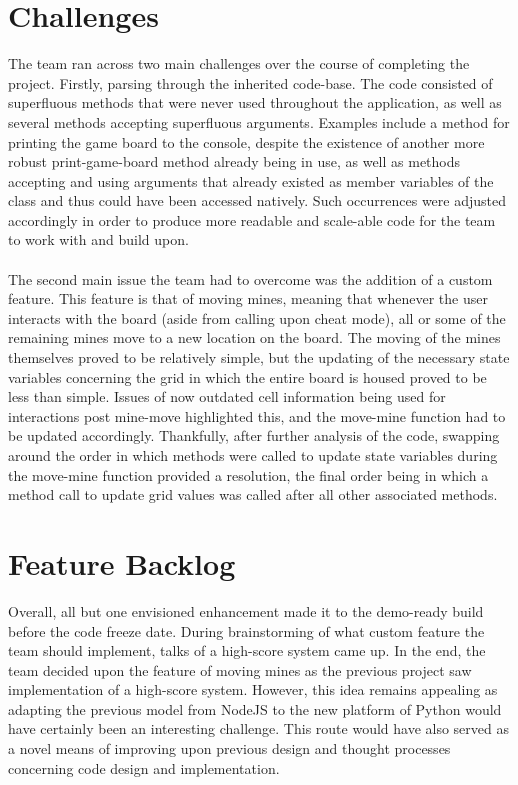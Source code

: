 \documentclass[12pt]{report}
\begin{document}
%
%
\section*{Challenges}
The team ran across two main challenges over the course of completing the project.
Firstly, parsing through the inherited code-base. The code consisted of superfluous methods that were never used throughout the application, as well as several methods accepting superfluous arguments. Examples include a method for printing the game board to the console, despite the existence of another more robust print-game-board method already being in use, as well as methods accepting and using arguments that already existed as member variables of the class and thus could have been accessed natively. Such occurrences were adjusted accordingly in order to produce more readable and scale-able code for the team to work with and build upon.
\\\\
The second main issue the team had to overcome was the addition of a custom feature. This feature is that of moving mines, meaning that whenever the user interacts with the board (aside from calling upon cheat mode), all or some of the remaining mines move to a new location on the board. The moving of the mines themselves proved to be relatively simple, but the updating of the necessary state variables concerning the grid in which the entire board is housed proved to be less than simple. Issues of now outdated cell information being used for interactions post mine-move highlighted this, and the move-mine function had to be updated accordingly. Thankfully, after further analysis of the code, swapping around the order in which methods were called to update state variables during the move-mine function provided a resolution, the final order being in which a method call to update grid values was called after all other associated methods.

\section*{Feature Backlog}
Overall, all but one envisioned enhancement made it to the demo-ready build before the code freeze date. During brainstorming of what custom feature the team should implement, talks of a high-score system came up. In the end, the team decided upon the feature of moving mines as the previous project saw implementation of a high-score system. However, this idea remains appealing as adapting the previous model from NodeJS to the new platform of Python would have certainly been an interesting challenge. This route would have also served as a novel means of improving upon previous design and thought processes concerning code design and implementation.
\end{document}
